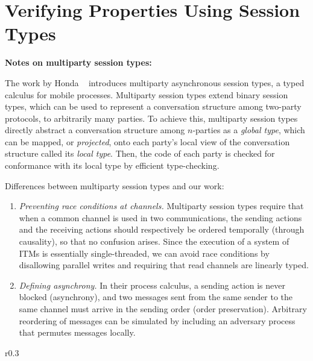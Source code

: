 \section{Verifying Properties Using Session Types}
\label{sec:session}





\textbf{Notes on multiparty session types:}

The work by Honda \etal~\cite{honda2008multiparty} introduces multiparty
asynchronous session types, a typed calculus for mobile processes. Multiparty
session types extend binary session types, which can be used to represent a
conversation structure among two-party protocols, to arbitrarily many
parties. To achieve this, multiparty session types directly abstract a
conversation structure among $n$-parties as a \emph{global type}, which can be
mapped, or \emph{projected}, onto each party's local view of the conversation
structure called its \emph{local type}. Then, the code of each party is checked
for conformance with its local type by efficient type-checking.

Differences between multiparty session types and our work:
\begin{enumerate}
  \item \emph{Preventing race conditions at channels.} Multiparty session types
    require that when a common channel is used in two communications, the
    sending actions and the receiving actions should respectively be ordered
    temporally (through causality), so that no confusion arises. Since the
    execution of a system of ITMs is essentially single-threaded, we can avoid
    race conditions by disallowing parallel writes and requiring that read
    channels are linearly typed.
  \item \emph{Defining asynchrony.} In their process calculus, a sending action
    is never blocked (asynchrony), and two messages sent from the same sender to
    the same channel must arrive in the sending order (order
    preservation). Arbitrary reordering of messages can be simulated by
    including an adversary process that permutes messages locally.
\end{enumerate}

\begingroup
\setlength\intextsep{0pt}
\begin{wrapfigure}{r}{0.3\textwidth}
  
\end{wrapfigure}

